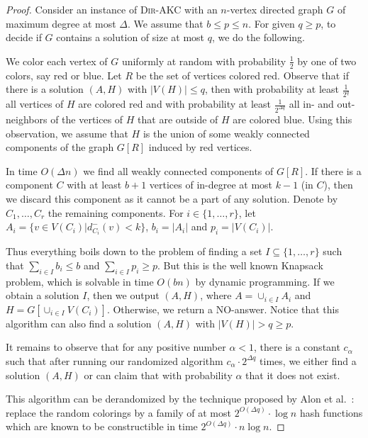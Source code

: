 \documentclass[11pt,a4paper]{article}
\newcommand{\DAKC}{\textsc{Dir-AKC}\xspace}
\begin{document}
\begin{proof}
Consider an instance of \DAKC with an $n$-vertex directed graph $G$ of maximum degree at most $\Delta$. We assume that $b\leq
p\leq n$. For given $q\geq p$, to decide if $G$ contains a solution of size at  most $q$, we do the following.

We color each vertex of $G$ uniformly at random with probability $\frac{1}{2}$ by one of  two colors, say red or
blue. Let  $R$ be the set of vertices  colored red. Observe that if there is a solution $(A,H)$ with $|V(H)|\leq q$, then with
probability at least $\frac{1}{2^q}$ all vertices of $H$ are colored red and with probability at least $\frac{1}{2^{\Delta q}}$
all 
in- and out-neighbors of the vertices of $H$ that are outside of $H$ are colored blue. Using this observation, we assume that
$H$ is the union of some weakly connected components of  the graph $G[R]$ induced by red vertices.

In time $O(\Delta n)$ we find all weakly connected components of $G[R]$. If there is a component $C$ with at least $b+1$
vertices of in-degree at most $k-1$ (in $C$), then we discard this component as it cannot be a part of any solution. Denote by
$C_1,\ldots,C_r$ the remaining components. For $i\in\{1,\ldots,r\}$, let $A_i=\{v\in V(C_i)|d_{C_i}^-(v)<k\}$, $b_i=|A_i|$ and
$p_i=|V(C_i)|$.

Thus everything boils down to the problem of finding a set $I\subseteq \{1,\ldots,r\}$ such that $\sum_{i\in I} b_i\leq b$ and
$\sum_{i\in I}p_i \geq p$.  But this is  the well known {\sc Knapsack} problem, which  is solvable in time $O(bn)$ by dynamic
programming. If we obtain a solution $I$, then we output $(A,H)$, where $A=\cup_{i\in I} A_i$ and $H=G[\cup_{i\in I}V(C_i)]$.
Otherwise, we return a NO-answer. Notice that this algorithm can also find a solution $(A,H)$  with $|V(H)|> q \geq p$.


It remains to observe that for any positive number $\alpha<1$, there is a constant $c_{\alpha}$ such that after running our
randomized algorithm $c_{\alpha}\cdot 2^{\Delta q}$ times, we either find a solution $(A,H)$ or can claim that with
probability $\alpha$ that it does not exist.


This algorithm can be derandomized by the  technique proposed by Alon et al.~\cite{AlonYZ95}: replace the random colorings by
a family of at most $2^{O(\Delta q)}\cdot \log n$ hash functions which are known to be constructible  in time $2^{O(\Delta
q)}\cdot n\log n$.
\end{proof}
\end{document}

